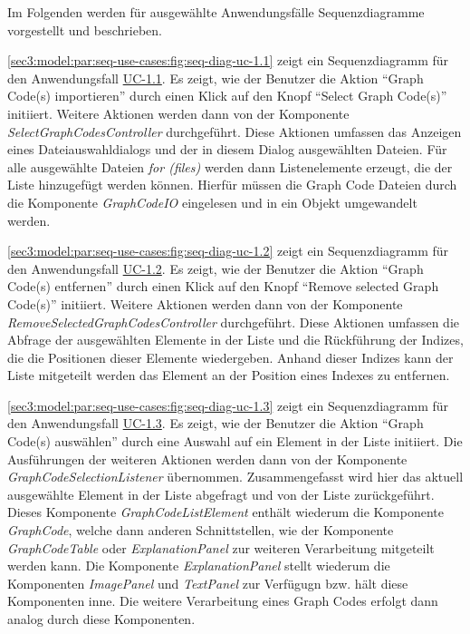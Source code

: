 Im Folgenden werden für ausgewählte Anwendungsfälle Sequenzdiagramme vorgestellt und beschrieben.



\cref{sec3:model:par:seq-use-cases:fig:seq-diag-uc-1.1} zeigt ein Sequenzdiagramm für den Anwendungsfall \hyperref[sec3:model:uc-1.1]{UC-1.1}.
Es zeigt, wie der Benutzer die Aktion \enquote{Graph Code(s) importieren} durch einen Klick auf den Knopf \enquote{Select Graph Code(s)} initiiert.
Weitere Aktionen werden dann von der Komponente \textit{SelectGraphCodesController} durchgeführt.
Diese Aktionen umfassen das Anzeigen eines Dateiauswahldialogs und der in diesem Dialog ausgewählten Dateien.
Für alle ausgewählte Dateien \textit{for (files)} werden dann Listenelemente erzeugt, die der Liste hinzugefügt werden können.
Hierfür müssen die Graph Code Dateien durch die Komponente \textit{GraphCodeIO} eingelesen und in ein Objekt umgewandelt werden.



\cref{sec3:model:par:seq-use-cases:fig:seq-diag-uc-1.2} zeigt ein Sequenzdiagramm für den Anwendungsfall \hyperref[sec3:model:uc-1.2]{UC-1.2}.
Es zeigt, wie der Benutzer die Aktion \enquote{Graph Code(s) entfernen} durch einen Klick auf den Knopf \enquote{Remove selected Graph Code(s)} initiiert.
Weitere Aktionen werden dann von der Komponente \textit{RemoveSelectedGraphCodesController} durchgeführt.
Diese Aktionen umfassen die Abfrage der ausgewählten Elemente in der Liste und die Rückführung der Indizes, die die Positionen dieser Elemente wiedergeben.
Anhand dieser Indizes kann der Liste mitgeteilt werden das Element an der Position eines Indexes zu entfernen.



\cref{sec3:model:par:seq-use-cases:fig:seq-diag-uc-1.3} zeigt ein Sequenzdiagramm für den Anwendungsfall \hyperref[sec3:model:uc-1.3]{UC-1.3}.
Es zeigt, wie der Benutzer die Aktion \enquote{Graph Code(s) auswählen} durch eine Auswahl auf ein Element in der Liste initiiert.
Die Ausführungen der weiteren Aktionen werden dann von der Komponente \textit{GraphCodeSelectionListener} übernommen.
Zusammengefasst wird hier das aktuell ausgewählte Element in der Liste abgefragt und von der Liste zurückgeführt.
Dieses Komponente \textit{GraphCodeListElement} enthält wiederum die Komponente \textit{GraphCode}, welche dann anderen Schnittstellen, wie der Komponente \textit{GraphCodeTable} oder \textit{ExplanationPanel} zur weiteren Verarbeitung mitgeteilt werden kann.
Die Komponente \textit{ExplanationPanel} stellt wiederum die Komponenten \textit{ImagePanel} und \textit{TextPanel} zur Verfügugn bzw. hält diese Komponenten inne.
Die weitere Verarbeitung eines Graph Codes erfolgt dann analog durch diese Komponenten.

